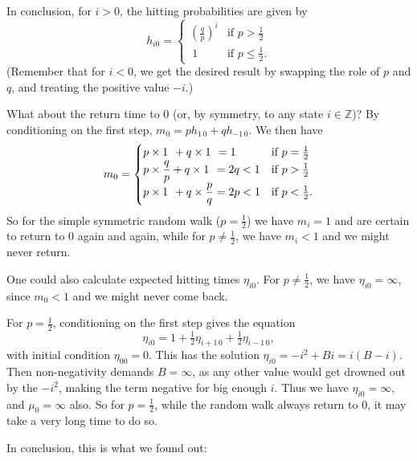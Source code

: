 \documentclass[
  a4paper,
]{article}
\theoremstyle{definition}
\theoremstyle{definition}
\theoremstyle{definition}
\theoremstyle{remark}
\begin{document}
In conclusion, for \(i > 0\), the hitting probabilities are given by
\[ h_{i0} = \begin{cases} \left(\displaystyle\frac{q}{p}\right)^i & \text{if $p > \frac12$} \\ \ 1 & \text{if $p \leq \frac12$.} \end{cases} \]
(Remember that for \(i < 0\), we get the desired result by swapping the role of \(p\) and \(q\), and treating the positive value \(-i\).)

What about the return time to \(0\) (or, by symmetry, to any state \(i \in \mathbb Z\))? By conditioning on the first step, \(m_0 = ph_{1\,0} + qh_{-1\,0}\). We then have
\[ m_0 = \begin{cases} p\times 1 \hspace{0.4em}+ q\times 1 \hspace{0.4em}= 1 & \text{if $p = \frac12$} \\
p \times \displaystyle\frac qp + q\times 1 \hspace{0.4em}= 2q < 1 & \text{if $p > \frac12$} \\
p\times 1 \hspace{0.4em} + q \times \displaystyle\frac pq = 2p < 1 & \text{if $p < \frac12$.}\end{cases} \]
So for the simple symmetric random walk (\(p = \frac12\)) we have \(m_i = 1\) and are certain to return to \(0\) again and again, while for \(p \neq \frac12\), we have \(m_i < 1\) and we might never return.

One could also calculate expected hitting times \(\eta_{i0}\). For \(p \neq \frac12\), we have \(\eta_{i0} = \infty\), since \(m_0 < 1\) and we might never come back.

For \(p = \frac12\), conditioning on the first step gives the equation
\[ \eta_{i0} = 1 + \tfrac12\eta_{i+1\,0} + \tfrac12\eta_{i-1\,0} , \]
with initial condition \(\eta_{00} = 0\). This has the solution \(\eta_{i0} = -i^2 + Bi = i(B-i)\). Then non-negativity demands \(B = \infty\), as any other value would get drowned out by the \(-i^2\), making the term negative for big enough \(i\). Thus we have \(\eta_{i0} = \infty\), and \(\mu_0 = \infty\) also.
So for \(p = \frac12\), while the random walk always return to \(0\), it may take a very long time to do so.

In conclusion, this is what we found out:
\end{document}
